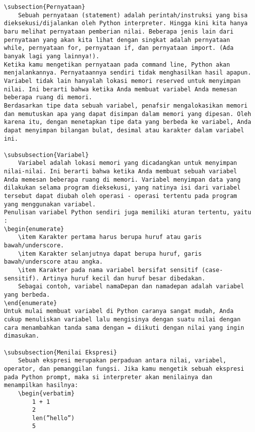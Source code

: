 \begin{verbatim}
\subsection{Pernyataan}
	Sebuah pernyataan (statement) adalah perintah/instruksi yang bisa dieksekusi/dijalankan oleh Python interpreter. Hingga kini kita hanya baru melihat pernyataan pemberian nilai. Beberapa jenis lain dari pernyataan yang akan kita lihat dengan singkat adalah pernyataan  while, pernyataan for, pernyataan if, dan pernyataan import. (Ada banyak lagi yang lainnya!).
Ketika kamu mengetikan pernyataan pada command line, Python akan menjalankannya. Pernyataannya sendiri tidak menghasilkan hasil apapun. 
Variabel tidak lain hanyalah lokasi memori reserved untuk menyimpan nilai. Ini berarti bahwa ketika Anda membuat variabel Anda memesan beberapa ruang di memori.
Berdasarkan tipe data sebuah variabel, penafsir mengalokasikan memori dan memutuskan apa yang dapat disimpan dalam memori yang dipesan. Oleh karena itu, dengan menetapkan tipe data yang berbeda ke variabel, Anda dapat menyimpan bilangan bulat, desimal atau karakter dalam variabel ini.

\subsubsection{Variabel}
	Variabel adalah lokasi memori yang dicadangkan untuk menyimpan nilai-nilai. Ini berarti bahwa ketika Anda membuat sebuah variabel Anda memesan beberapa ruang di memori. Variabel menyimpan data yang dilakukan selama program dieksekusi, yang natinya isi dari variabel tersebut dapat diubah oleh operasi - operasi tertentu pada program yang menggunakan variabel.
Penulisan variabel Python sendiri juga memiliki aturan tertentu, yaitu : 
\begin{enumerate}
	\item Karakter pertama harus berupa huruf atau garis bawah/underscore.
 	\item Karakter selanjutnya dapat berupa huruf, garis bawah/underscore atau angka.
	\item Karakter pada nama variabel bersifat sensitif (case-sensitif). Artinya huruf kecil dan huruf besar dibedakan. 
	Sebagai contoh, variabel namaDepan dan namadepan adalah variabel yang berbeda.
\end{enumerate}
Untuk mulai membuat variabel di Python caranya sangat mudah, Anda cukup menuliskan variabel lalu mengisinya dengan suatu nilai dengan cara menambahkan tanda sama dengan = diikuti dengan nilai yang ingin dimasukan. 

\subsubsection{Menilai Ekspresi}
	Sebuah ekspresi merupakan perpaduan antara nilai, variabel, operator, dan pemanggilan fungsi. Jika kamu mengetik sebuah ekspresi pada Python prompt, maka si interpreter akan menilainya dan menampilkan hasilnya:
	\begin{verbatim}
		1 + 1 
		2 
		len(”hello”) 
		5 
	\end{verbatim}
